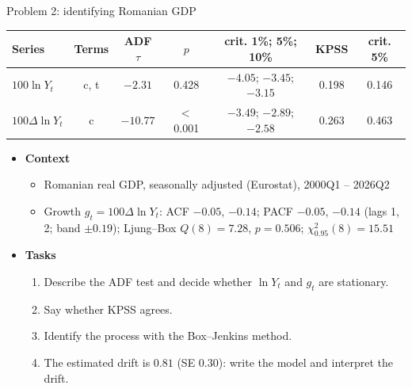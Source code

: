 \begin{frame}{Problem 2: identifying Romanian GDP}
\itemsize{\footnotesize}
\begin{center}
\scriptsize
\begin{tabular}{lcccccc}
\toprule
\textbf{Series} & Terms & ADF $\tau$ & $p$ & crit. 1\%; 5\%; 10\% & KPSS & crit. 5\% \\
\midrule
$100\ln Y_t$ & c, t & $\ensuremath{-}2.31$ & 0.428 & $\ensuremath{-}4.05$; $\ensuremath{-}3.45$; $\ensuremath{-}3.15$ & 0.198 & 0.146 \\
$100\Delta\ln Y_t$ & c & $\ensuremath{-}10.77$ & $<$\,0.001 & $\ensuremath{-}3.49$; $\ensuremath{-}2.89$; $\ensuremath{-}2.58$ & 0.263 & 0.463 \\
\bottomrule
\end{tabular}
\end{center}
\begin{itemize}
    \item \textbf{Context}
    \begin{itemize}
        \item Romanian real GDP, seasonally adjusted (Eurostat), 2000Q1 -- 2026Q2
        \item Growth $g_t = 100\Delta\ln Y_t$: ACF $\ensuremath{-}0.05$, $\ensuremath{-}0.14$; PACF $\ensuremath{-}0.05$, $\ensuremath{-}0.14$ (lags 1, 2; band $\pm 0.19$); Ljung--Box $Q(8) = 7.28$, $p = 0.506$; $\chi^2_{0.95}(8) = 15.51$
    \end{itemize}
    \item \textbf{Tasks}
\begin{enumerate}
    \item Describe the ADF test and decide whether $\ln Y_t$ and $g_t$ are stationary.
    \item Say whether KPSS agrees.
    \item Identify the process with the Box--Jenkins method.
    \item The estimated drift is $0.81$ (SE $0.30$): write the model and interpret the drift.
\end{enumerate}
\end{itemize}
\end{frame}

